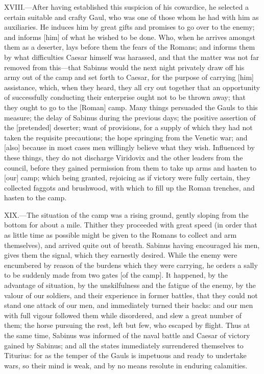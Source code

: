 XVIII.—After having established this suspicion of his cowardice, he
selected a certain suitable and crafty Gaul, who was one of those whom
he had with him as auxiliaries. He induces him by great gifts and
promises to go over to the enemy; and informs [him] of what he wished to
be done. Who, when he arrives amongst them as a deserter, lays before
them the fears of the Romans; and informs them by what difficulties
Caesar himself was harassed, and that the matter was not far removed
from this—that Sabinus would the next night privately draw off his army
out of the camp and set forth to Caesar, for the purpose of carrying
[him] assistance, which, when they heard, they all cry out together that
an opportunity of successfully conducting their enterprise ought not to
be thrown away; that they ought to go to the [Roman] camp. Many things
persuaded the Gauls to this measure; the delay of Sabinus during the
previous days; the positive assertion of the [pretended] deserter; want
of provisions, for a supply of which they had not taken the requisite
precautions; the hope springing from the Venetic war; and [also] because
in most cases men willingly believe what they wish. Influenced by these
things, they do not discharge Viridovix and the other leaders from the
council, before they gained permission from them to take up arms and
hasten to [our] camp; which being granted, rejoicing as if victory were
fully certain, they collected faggots and brushwood, with which to fill
up the Roman trenches, and hasten to the camp.

XIX.—The situation of the camp was a rising ground, gently sloping from
the bottom for about a mile. Thither they proceeded with great speed (in
order that as little time as possible might be given to the Romans to
collect and arm themselves), and arrived quite out of breath. Sabinus
having encouraged his men, gives them the signal, which they earnestly
desired. While the enemy were encumbered by reason of the burdens which
they were carrying, he orders a sally to be suddenly made from two gates
[of the camp]. It happened, by the advantage of situation, by the
unskilfulness and the fatigue of the enemy, by the valour of our
soldiers, and their experience in former battles, that they could not
stand one attack of our men, and immediately turned their backs: and our
men with full vigour followed them while disordered, and slew a great
number of them; the horse pursuing the rest, left but few, who escaped
by flight. Thus at the same time, Sabinus was informed of the naval
battle and Caesar of victory gained by Sabinus; and all the states
immediately surrendered themselves to Titurius: for as the temper of the
Gauls is impetuous and ready to undertake wars, so their mind is weak,
and by no means resolute in enduring calamities.

